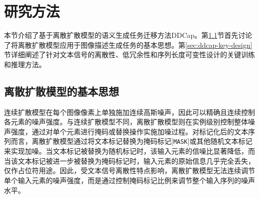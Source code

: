 


\section{研究方法}
\label{sec:ddcap-method-all}
本节介绍了基于离散扩散模型的语义生成任务迁移方法DDCap。第\ref{sec:ddcap-method}节首先讨论了将离散扩散模型应用于图像描述生成任务的基本思想。第\ref{sec:ddcap-key-design}节详细阐述了针对文本信号的离散性、低冗余性和序列长度可变性设计的关键训练和推理方法。


\subsection{离散扩散模型的基本思想}
\label{sec:ddcap-method}
连续扩散模型在每个图像像素上单独施加连续高斯噪声，因此可以精确且连续控制各元素的噪声强度。与连续扩散模型不同，离散扩散模型则在实例级别控制整体噪声强度，通过对单个元素进行掩码或替换操作实施加噪过程。对标记化后的文本序列而言，离散扩散模型通过将文本标记替换为掩码标记[\texttt{MASK}]或其他随机文本标记来实现加噪。当文本标记被替换为随机标记时，该输入元素的信噪比显著降低，而当该文本标记被进一步被替换为掩码标记时，输入元素的原始信息几乎完全丢失，仅作占位符用途。因此，受文本信号离散性特点影响，离散扩散模型无法连续调节单个输入元素的噪声强度，而是通过控制掩码标记比例来调节整个输入序列的噪声水平。

